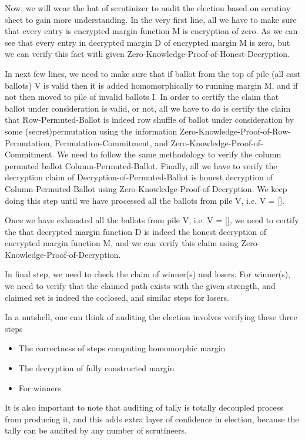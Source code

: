 \documentclass{llncs}
\begin{document}
Now, we will wear the hat of scrutinizer to audit the election based on 
 scrutiny sheet to gain more understanding. In the very first line, all we 
 have to make sure that every entry is encrypted margin function M is encryption 
 of zero. As we can see that every entry in decrypted margin D 
 of encrypted margin M is zero, but we can verify this fact with 
 given Zero-Knowledge-Proof-of-Honest-Decryption.
 
 In next few lines, we need to make sure that if ballot from the top of 
 pile (all cast ballots) V is valid then it is added homomorphically to 
 running margin M, 
 and if not then moved to pile of invalid ballots I. In 
 order to certify the claim that ballot under consideration is valid, 
 or not, all we have to do is certify the claim that Row-Permuted-Ballot 
 is indeed row shuffle of ballot under consideration by 
 some (secret)permutation using the information  
 Zero-Knowledge-Proof-of-Row-Permutation, Permutation-Commitment, and 
 Zero-Knowledge-Proof-of-Commitment. We need to follow the same methodology 
 to verify the column permuted ballot Column-Permuted-Ballot. Finally, 
 all we have to verify the decryption claim of Decryption-of-Permuted-Ballot
 is honest decryption of Column-Permuted-Ballot using 
 Zero-Knowledge-Proof-of-Decryption. We keep doing this step until we have 
 processed all the ballots from pile V, i.e. V = []. 
 
 Once we have exhausted all the ballots from pile V, i.e. V = [], we 
 need to certify the that decrypted margin function D is indeed the 
 honest decryption of encrypted margin function M, and we can 
 verify this claim using Zero-Knowledge-Proof-of-Decryption.
 
 In final step, we need to check the claim of winner(s) and losers. 
 For winner(s), we need to verify that the claimed path exists with 
 the given strength, and claimed set is indeed the coclosed, and similar
 steps for losers.

In a nutshell, one can 
think of auditing the election involves verifying these three steps
\begin{itemize}
 \item The correctness of steps computing homomorphic margin 
 \item The decryption of fully constructed margin
 \item For winners 
\end{itemize} 

It is also important to note that auditing of tally is totally decoupled process 
from producing it, and this adds extra layer of confidence in election, because
the tally can be audited by any number of scrutineers. 
\end{document}
